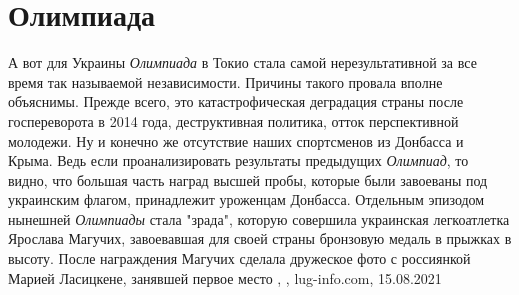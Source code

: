  
 
 
 
 
\chapter{Олимпиада}
\label{sec:slova.olimpiada}

А вот для Украины \emph{Олимпиада} в Токио стала самой нерезультативной за все время
так называемой независимости. Причины такого провала вполне объяснимы. Прежде
всего, это катастрофическая деградация страны после госпереворота в 2014 года,
деструктивная политика, отток перспективной молодежи. Ну и конечно же
отсутствие наших спортсменов из Донбасса и Крыма. Ведь если проанализировать
результаты предыдущих \emph{Олимпиад}, то видно, что большая часть наград высшей
пробы, которые были завоеваны под украинским флагом, принадлежит уроженцам
Донбасса.  Отдельным эпизодом нынешней \emph{Олимпиады} стала "зрада", которую
совершила украинская легкоатлетка Ярослава Магучих, завоевавшая для своей
страны бронзовую медаль в прыжках в высоту. После награждения Магучих сделала
дружеское фото с россиянкой Марией Ласицкене, занявшей первое место
, 
, lug-info.com, 15.08.2021

